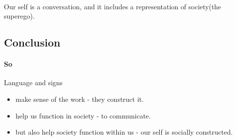 \documentclass{article}
\begin{document}
	\paragraph{} Our self is a conversation, and it includes a representation of society(the superego).
	
	\subsection{Conclusion}
	\paragraph{So } Language and signs
	\begin{itemize}
	   \item  make sense of the work - they construct it.
	   \item help us function in society - to communicate.
	   \item but also help society function within us - our self is socially constructed.   
	\end{itemize}
\end{document}
